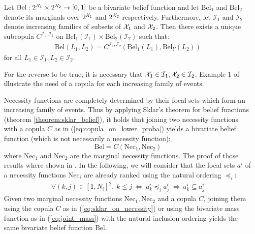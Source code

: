 \begin{theorem}\label{theorem:sklar_belief}
    Let $\mathrm{Bel}:2^{{\mathcal{X}}_1}\times2^{{\mathcal{X}}_2}\rightarrow[0,1]$ be a bivariate belief function and let $\mathrm{Bel}_1$ and $\mathrm{Bel}_2$ denote its marginals over $2^{{\mathcal{X}}_1}$ and $2^{{\mathcal{X}}_2}$ respectively. Furthermore, let $\mathcal{I}_1$ and $\mathcal{I}_2$ denote increasing families of subsets of ${\mathcal{X}}_1$ and ${\mathcal{X}}_2$. Then there exists a unique subcopula $C^{\mathcal{I}_1,\mathcal{I}_2}$ on  $\mathrm{Bel}_1(\mathcal{I}_1)\times \mathrm{Bel}_2(\mathcal{I}_2)$ such that:
    \begin{eqnarray}
        \mathrm{Bel}(L_1, L_2) = C^{\mathcal{I}_1,\mathcal{I}_2}(\mathrm{Bel}_1(L_1), \mathrm{Bel}_Y(L_2))
    \end{eqnarray}
    for all $L_1\in\mathcal{I}_1,L_2\in\mathcal{I}_2$.
\end{theorem}
For the reverse to be true, it is necessary that ${\mathcal{X}}_1\in\mathcal{I}_1, {\mathcal{X}}_2\in\mathcal{I}_2$. Example 1 of \cite{schmelzer_joint_2015} illustrate the need of a copula for each increasing family of events.

Necessity functions are completely determined by their focal sets which form an increasing family of events. Thus by applying Sklar's theorem for belief functions (theorem \ref{theorem:sklar_belief}), it holds that joining two necessity functions with a copula $C$ as in (\ref{eq:copula_on_lower_proba}) yields a bivariate belief function (which is not necessarily a necessity function):
\begin{equation}
    \mathrm{Bel} = C(\mathrm{Nec}_1, \mathrm{Nec}_2)\label{eq:sklar_on_necessity}
\end{equation}
where $\mathrm{Nec}_1$ and $\mathrm{Nec}_2$ are the marginal necessity functions. The proof of those results where shown in \cite{schmelzer_joint_2015,schmelzer_sklars_2015}. In the following, we will consider that the focal sets $a^i$ of a necessity functions $\mathrm{Nec}_i$ are already ranked using the natural ordering $\preceq_i$:
\begin{eqnarray}
    \forall (k,j)\in[1, N_i]^2,~k\leqslant j ~\Leftrightarrow ~ a^i_k \preceq_i a^i_j ~\Leftrightarrow ~ a^i_k\subseteq a^i_j
\end{eqnarray}
Given two marginal necessity functions $\mathrm{Nec}_1, \mathrm{Nec}_2$ and a copula $C$, joining them using the copula $C$ as in (\ref{eq:sklar_on_necessity}) or using the bivariate mass function as in (\ref{eq:joint_mass}) with the natural inclusion ordering yields the same bivariate belief function $\mathrm{Bel}$.

